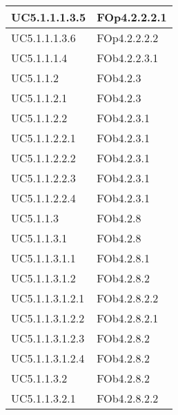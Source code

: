 \begin{longtable}{|l|p{4cm}|}
\hline
		UC5.1.1.1.3.5 & FOp4.2.2.2.1 \linebreak   \\
\hline
		UC5.1.1.1.3.6 & FOp4.2.2.2.2 \linebreak   \\
\hline
		UC5.1.1.1.4 & FOb4.2.2.3.1 \linebreak   \\
\hline
		UC5.1.1.2 & FOb4.2.3 \linebreak   \\
\hline
		UC5.1.1.2.1 & FOb4.2.3 \linebreak   \\
\hline
		UC5.1.1.2.2 & FOb4.2.3.1 \linebreak   \\
\hline
		UC5.1.1.2.2.1 & FOb4.2.3.1 \linebreak   \\
\hline
		UC5.1.1.2.2.2 & FOb4.2.3.1 \linebreak   \\
\hline
		UC5.1.1.2.2.3 & FOb4.2.3.1 \linebreak   \\
\hline
		UC5.1.1.2.2.4 & FOb4.2.3.1 \linebreak   \\
\hline
		UC5.1.1.3 & FOb4.2.8 \linebreak   \\
\hline
		UC5.1.1.3.1 & FOb4.2.8 \linebreak   \\
\hline
		UC5.1.1.3.1.1 & FOb4.2.8.1 \linebreak   \\
\hline
		UC5.1.1.3.1.2 & FOb4.2.8.2 \linebreak   \\
\hline
		UC5.1.1.3.1.2.1 & FOb4.2.8.2.2 \linebreak   \\
\hline
		UC5.1.1.3.1.2.2 & FOb4.2.8.2.1 \linebreak   \\
\hline
		UC5.1.1.3.1.2.3 & FOb4.2.8.2 \linebreak   \\
\hline
		UC5.1.1.3.1.2.4 & FOb4.2.8.2 \linebreak   \\
\hline
		UC5.1.1.3.2 & FOb4.2.8.2 \linebreak   \\
\hline
		UC5.1.1.3.2.1 & FOb4.2.8.2.2 \linebreak   \\

\end{longtable}
